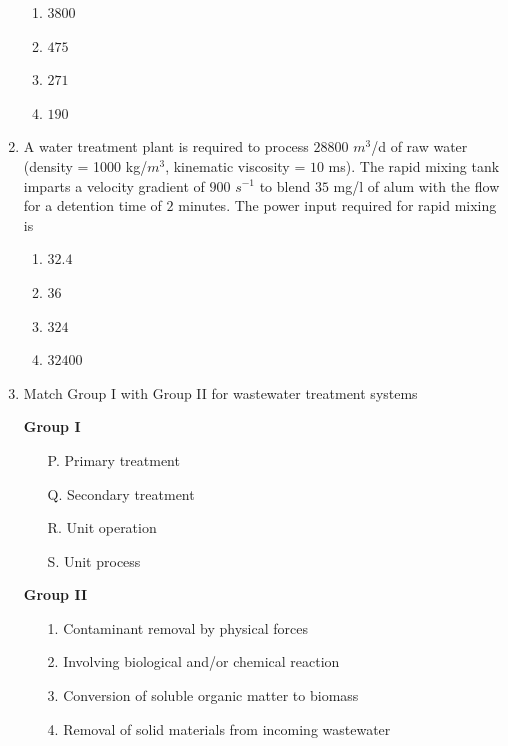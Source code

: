 \documentclass[journal]{IEEEtran}
\begin{document}
\begin{enumerate}
\begin{enumerate}
\item $3800$
\item $475$
\item $271$
\item $190$
\end{enumerate}  

\item A water treatment plant is required to process $28800$ $m^{3}$/d of raw water (density = 1000 kg/$m^{3}$, kinematic viscosity = $10$ ms). The rapid mixing tank imparts a velocity gradient of $900$ $s^{-1}$ to blend $35$ mg/l of alum with the flow for a detention time of $2$ minutes. The power input  required for rapid mixing is \hfill {}

\begin{enumerate}
\item $32.4$
\item $36$
\item $324$
\item $32400$
\end{enumerate}  

\item Match Group I  with Group II  for wastewater treatment systems \hfill {}

\begin{minipage}[t]{0.45\textwidth}
\textbf{Group I}
\begin{enumerate}[align=left]
    \item[P.] Primary treatment
    \item[Q.] Secondary treatment
    \item[R.] Unit operation
    \item[S.] Unit process
\end{enumerate}
\end{minipage}
\hfill
\begin{minipage}[t]{0.45\textwidth}
\textbf{Group II}
\begin{enumerate}[align=left]
    \item[1.] Contaminant removal by physical forces
    \item[2.] Involving biological and/or chemical reaction
    \item[3.] Conversion of soluble organic matter to biomass
    \item[4.] Removal of solid materials from incoming wastewater
\end{enumerate}
\end{minipage}



\end{enumerate}
\end{document}
